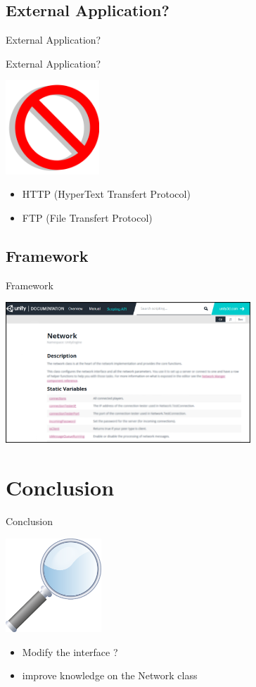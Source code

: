 \documentclass[a4paper,10pt]{beamer}
\begin{document}
		\subsection{External Application?}
			
			\begin{frame}{External Application?}
				
			\end{frame}
			
			\begin{frame}{External Application?}
				\centerline{\includegraphics[height=100pt]{images/network/no.png}}
				\begin{itemize}
					\item HTTP (HyperText Transfert Protocol)
					\item FTP (File Transfert Protocol)
				\end{itemize}
			\end{frame}
		
		\subsection{Framework}
		
			\begin{frame}{Framework}
				\centerline{\includegraphics[height=150pt]{images/network/networkclass.png}}
			\end{frame}
	
	\section{Conclusion}
	
		\begin{frame}{Conclusion}
			\centerline{\includegraphics[height=100pt]{images/conclusion/loupe.png}}
			\begin{itemize}
				\item Modify the interface ?
				\item improve knowledge on the Network class
			\end{itemize}
		\end{frame}
\end{document}
